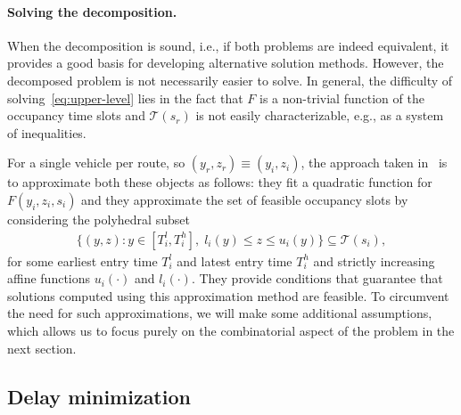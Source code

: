\documentclass[a4paper]{report}
\theoremstyle{definition}
\theoremstyle{plain}
\begin{document}
\paragraph{Solving the decomposition.}

When the decomposition is sound, i.e., if both problems are indeed equivalent,
it provides a good basis for developing alternative solution methods. However,
the decomposed problem is not necessarily easier to solve.
%
In general, the difficulty of solving~\eqref{eq:upper-level} lies in the fact
that $F$ is a non-trivial function of the occupancy time slots and
$\mathcal{T}(s_{r})$ is not easily characterizable, e.g., as a system of
inequalities.

For a single vehicle per route, so $(y_{r}, z_{r}) \equiv (y_{i},z_{i})$, the
approach taken in~\cite{hultApproximateSolutionOptimal2015} is to approximate
both these objects as follows: they fit a quadratic function for
$F(y_{i}, z_{i}, s_{i})$ and they approximate the set of feasible occupancy
slots by considering the polyhedral subset
\begin{align}
  \{ (y, z) : y \in [T_{i}^{l},T_{i}^{h}], \; l_{i}(y) \leq z \leq u_{i}(y) \} \subseteq \mathcal{T}(s_{i}) ,
\end{align}
for some earliest entry time $T_{i}^{l}$ and latest entry time $T_{i}^{h}$ and
strictly increasing affine functions $u_{i}(\cdot)$ and $l_{i}(\cdot)$. They
provide conditions that guarantee that solutions computed using this
approximation method are feasible.
%
To circumvent the need for such approximations, we will make some additional
assumptions, which allows us to focus purely on the combinatorial aspect of the
problem in the next section.

\subsection{Delay minimization}\label{sec:delay-minimization}
\end{document}
